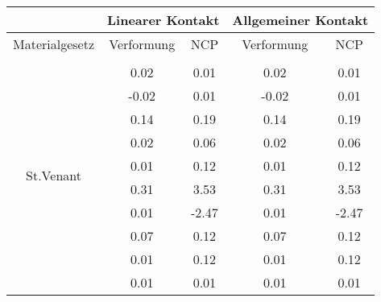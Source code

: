 \begin{table} 
\centering 
\begin{tabular}{c|cc|cc|} 
\cline{2-5} 
 & \multicolumn{2}{|c|}{Linearer Kontakt} & \multicolumn{2}{|c|}{Allgemeiner Kontakt} \\ 
\hline 
\multicolumn{1}{|c|}{Materialgesetz} & \multicolumn{1}{c|}{Verformung} & \multicolumn{1}{c|}{NCP} & \multicolumn{1}{c|}{Verformung} & \multicolumn{1}{c|}{NCP} \\ 
\hline 
\multicolumn{1}{|c|}{\multirow{26}{*}{St.Venant}} &\multicolumn{1}{|c|}{} & \multicolumn{1}{|c|}{} & \multicolumn{1}{|c|}{} & \multicolumn{1}{|c|}{} \\ 
\multicolumn{1}{|c|}{} & \multicolumn{1}{|c|}{      0.02} & \multicolumn{1}{|c|}{      0.01} & \multicolumn{1}{|c|}{      0.02} & \multicolumn{1}{|c|}{      0.01} \\ 
\multicolumn{1}{|c|}{} & \multicolumn{1}{|c|}{     -0.02} & \multicolumn{1}{|c|}{      0.01} & \multicolumn{1}{|c|}{     -0.02} & \multicolumn{1}{|c|}{      0.01} \\ 
\multicolumn{1}{|c|}{} & \multicolumn{1}{|c|}{      0.14} & \multicolumn{1}{|c|}{      0.19} & \multicolumn{1}{|c|}{      0.14} & \multicolumn{1}{|c|}{      0.19} \\ 
\multicolumn{1}{|c|}{} & \multicolumn{1}{|c|}{      0.02} & \multicolumn{1}{|c|}{      0.06} & \multicolumn{1}{|c|}{      0.02} & \multicolumn{1}{|c|}{      0.06} \\ 
\multicolumn{1}{|c|}{} & \multicolumn{1}{|c|}{      0.01} & \multicolumn{1}{|c|}{      0.12} & \multicolumn{1}{|c|}{      0.01} & \multicolumn{1}{|c|}{      0.12} \\ 
\multicolumn{1}{|c|}{} & \multicolumn{1}{|c|}{      0.31} & \multicolumn{1}{|c|}{      3.53} & \multicolumn{1}{|c|}{      0.31} & \multicolumn{1}{|c|}{      3.53} \\ 
\multicolumn{1}{|c|}{} & \multicolumn{1}{|c|}{      0.01} & \multicolumn{1}{|c|}{     -2.47} & \multicolumn{1}{|c|}{      0.01} & \multicolumn{1}{|c|}{     -2.47} \\ 
\multicolumn{1}{|c|}{} & \multicolumn{1}{|c|}{      0.07} & \multicolumn{1}{|c|}{      0.12} & \multicolumn{1}{|c|}{      0.07} & \multicolumn{1}{|c|}{      0.12} \\ 
\multicolumn{1}{|c|}{} & \multicolumn{1}{|c|}{      0.01} & \multicolumn{1}{|c|}{      0.12} & \multicolumn{1}{|c|}{      0.01} & \multicolumn{1}{|c|}{      0.12} \\ 
\multicolumn{1}{|c|}{} & \multicolumn{1}{|c|}{      0.01} & \multicolumn{1}{|c|}{      0.01} & \multicolumn{1}{|c|}{      0.01} & \multicolumn{1}{|c|}{      0.01} \\ 

\end{tabular}
\end{table}

